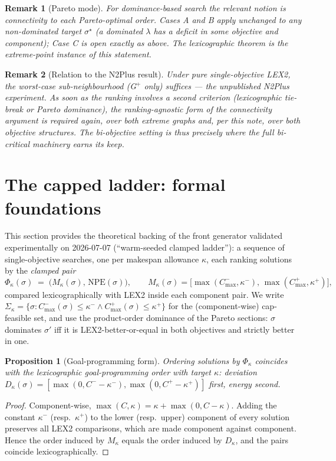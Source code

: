 \documentclass[11pt,a4paper]{article}
\newtheorem{proposition}{Proposition}
\newtheorem{remark}{Remark}
\newcommand{\NPE}{\mathrm{NPE}}
\begin{document}
\begin{remark}[Pareto mode]
For dominance-based search the relevant notion is connectivity to
\emph{each} Pareto-optimal order. Cases A and B apply unchanged to any
non-dominated target $\sigma^{\star}$ (a dominated $\lambda$ has a deficit
in some objective and component); Case C is open exactly as above. The
lexicographic theorem is the extreme-point instance of this statement.
\end{remark}

\begin{remark}[Relation to the N2Plus result]
Under pure single-objective LEX2, the worst-case sub-neighbourhood
(G$^{+}$ only) suffices — the unpublished N2Plus experiment. As soon as the
ranking involves a second criterion (lexicographic tie-break or Pareto
dominance), the ranking-agnostic form of the connectivity argument is
required again, over both extreme graphs and, per this note, over both
objective structures. The bi-objective setting is thus precisely where the
full bi-critical machinery earns its keep.
\end{remark}

\section{The capped ladder: formal foundations}
\label{sec:ladder}

This section provides the theoretical backing of the front generator
validated experimentally on 2026-07-07 (``warm-seeded clamped ladder''):
a sequence of single-objective searches, one per makespan allowance
$\kappa$, each ranking solutions by the \emph{clamped pair}
\[
\Phi_\kappa(\sigma)\;=\;\bigl(M_\kappa(\sigma),\,\mathbf{\NPE}(\sigma)\bigr),
\qquad
M_\kappa(\sigma)=\bigl[\max(C^-_{\max},\kappa^-),\,\max(C^+_{\max},\kappa^+)\bigr],
\]
compared lexicographically with LEX2 inside each component pair. We write
$\Sigma_\kappa=\{\sigma: C^-_{\max}(\sigma)\le\kappa^-\wedge
C^+_{\max}(\sigma)\le\kappa^+\}$ for the (component-wise) cap-feasible set,
and use the product-order dominance of the Pareto sections: $\sigma$
dominates $\sigma'$ iff it is LEX2-better-or-equal in both objectives and
strictly better in one.

\begin{proposition}[Goal-programming form]\label{prop:goal}
Ordering solutions by $\Phi_\kappa$ coincides with the lexicographic
goal-programming order with target $\kappa$: deviation
$D_\kappa(\sigma)=[\max(0,C^--\kappa^-),\max(0,C^+-\kappa^+)]$ first,
energy second.
\end{proposition}
\begin{proof}
Component-wise, $\max(C,\kappa)=\kappa+\max(0,C-\kappa)$. Adding the
constant $\kappa^-$ (resp.\ $\kappa^+$) to the lower (resp.\ upper)
component of every solution preserves all LEX2 comparisons, which are
made component against component. Hence the order induced by $M_\kappa$
equals the order induced by $D_\kappa$, and the pairs coincide
lexicographically.
\end{proof}
\end{document}
